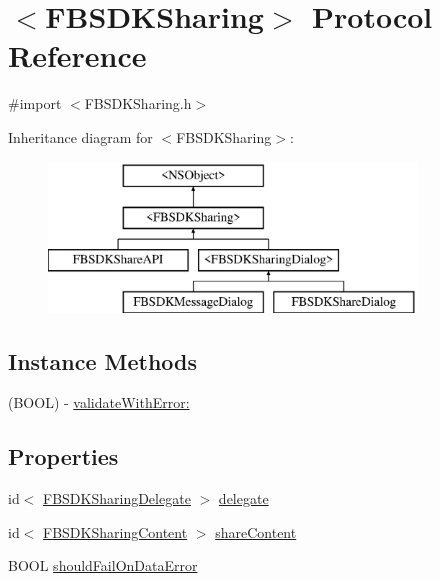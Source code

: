 \hypertarget{protocol_f_b_s_d_k_sharing-p}{}\section{$<$F\+B\+S\+D\+K\+Sharing$>$ Protocol Reference}
\label{protocol_f_b_s_d_k_sharing-p}


{\ttfamily \#import $<$F\+B\+S\+D\+K\+Sharing.\+h$>$}

Inheritance diagram for $<$F\+B\+S\+D\+K\+Sharing$>$\+:\begin{figure}[H]
\begin{center}
\leavevmode
\includegraphics[height=4.000000cm]{protocol_f_b_s_d_k_sharing-p}
\end{center}
\end{figure}
\subsection*{Instance Methods}
\begin{DoxyCompactItemize}
\item 
(B\+O\+O\+L) -\/ \hyperlink{protocol_f_b_s_d_k_sharing-p_af70f439e9b7caf3671d798c29458fe59}{validate\+With\+Error\+:}
\end{DoxyCompactItemize}
\subsection*{Properties}
\begin{DoxyCompactItemize}
\item 
id$<$ \hyperlink{protocol_f_b_s_d_k_sharing_delegate-p}{F\+B\+S\+D\+K\+Sharing\+Delegate} $>$ \hyperlink{protocol_f_b_s_d_k_sharing-p_a310585baeb89d309bda3879aaa1be72d}{delegate}
\item 
id$<$ \hyperlink{protocol_f_b_s_d_k_sharing_content-p}{F\+B\+S\+D\+K\+Sharing\+Content} $>$ \hyperlink{protocol_f_b_s_d_k_sharing-p_a9cc352e3d8e8aec628ba42e8718bbeaf}{share\+Content}
\item 
B\+O\+O\+L \hyperlink{protocol_f_b_s_d_k_sharing-p_ac1c01a21db7b956e8ea47df72f01d12d}{should\+Fail\+On\+Data\+Error}
\end{DoxyCompactItemize}



